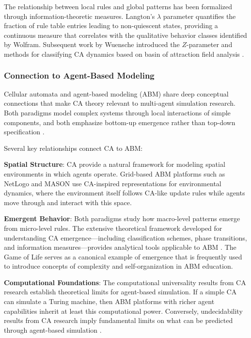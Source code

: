 The relationship between local rules and global patterns has been formalized through information-theoretic measures. Langton's $\lambda$ parameter \cite{langton1990computation} quantifies the fraction of rule table entries leading to non-quiescent states, providing a continuous measure that correlates with the qualitative behavior classes identified by Wolfram. Subsequent work by Wuensche introduced the $Z$-parameter and methods for classifying CA dynamics based on basin of attraction field analysis \cite{wuensche1999classifying}.

\subsubsection{Connection to Agent-Based Modeling}

Cellular automata and agent-based modeling (ABM) share deep conceptual connections that make CA theory relevant to multi-agent simulation research. Both paradigms model complex systems through local interactions of simple components, and both emphasize bottom-up emergence rather than top-down specification \cite{epstein1996growing}.

Several key relationships connect CA to ABM:

\textbf{Spatial Structure}: CA provide a natural framework for modeling spatial environments in which agents operate. Grid-based ABM platforms such as NetLogo \cite{wilensky1999netlogo} and MASON \cite{luke2005mason} use CA-inspired representations for environmental dynamics, where the environment itself follows CA-like update rules while agents move through and interact with this space.

\textbf{Emergent Behavior}: Both paradigms study how macro-level patterns emerge from micro-level rules. The extensive theoretical framework developed for understanding CA emergence---including classification schemes, phase transitions, and information measures---provides analytical tools applicable to ABM \cite{mitchell2009complexity}. The Game of Life serves as a canonical example of emergence that is frequently used to introduce concepts of complexity and self-organization in ABM education.

\textbf{Computational Foundations}: The computational universality results from CA research establish theoretical limits for agent-based simulation. If a simple CA can simulate a Turing machine, then ABM platforms with richer agent capabilities inherit at least this computational power. Conversely, undecidability results from CA research imply fundamental limits on what can be predicted through agent-based simulation \cite{ilachinski2001cellular}.

